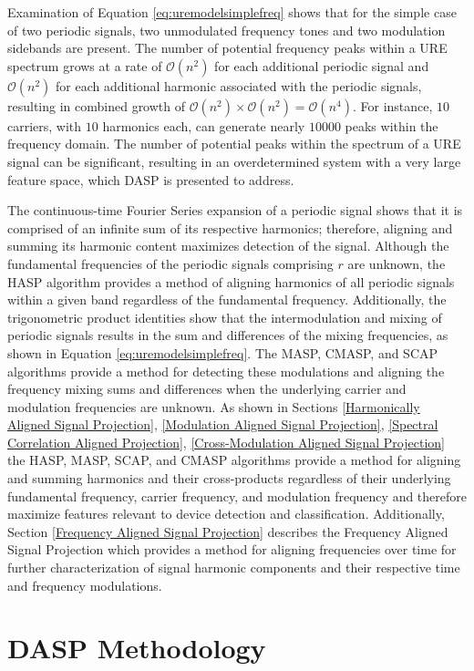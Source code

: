 Examination of Equation \ref{eq:uremodelsimplefreq} shows that for the simple case of two periodic signals, two unmodulated frequency tones and two modulation sidebands are present.  The number of potential frequency peaks within a URE spectrum grows at a rate of $\mathcal{O}(n^2)$ for each additional periodic signal and $\mathcal{O}(n^2)$ for each additional harmonic associated with the periodic signals, resulting in combined growth of $\mathcal{O}(n^2) \times \mathcal{O}(n^2) = \mathcal{O}(n^4)$.  For instance, $10$ carriers, with $10$ harmonics each, can generate nearly $10000$ peaks within the frequency domain. The number of potential peaks within the spectrum of a URE signal can be significant, resulting in an overdetermined system with a very large feature space, which DASP is presented to address.   

The continuous-time Fourier Series expansion of a periodic signal shows that it is comprised of an infinite sum of its respective harmonics; therefore, aligning and summing its harmonic content maximizes detection of the signal.  Although the fundamental frequencies of the periodic signals comprising $r$ are unknown, the HASP algorithm provides a method of aligning harmonics of all periodic signals within a given band regardless of the fundamental frequency.  Additionally, the trigonometric product identities show that the intermodulation and mixing of periodic signals results in the sum and differences of the mixing frequencies, as shown in Equation \ref{eq:uremodelsimplefreq}.  The MASP, CMASP, and SCAP algorithms provide a method for detecting these modulations and aligning the frequency mixing sums and differences when the underlying carrier and modulation frequencies are unknown.  As shown in Sections \ref{Harmonically Aligned Signal Projection}, \ref{Modulation Aligned Signal Projection}, \ref{Spectral Correlation Aligned Projection}, \ref{Cross-Modulation Aligned Signal Projection} the HASP, MASP, SCAP, and CMASP algorithms provide a method for aligning and summing harmonics and their cross-products regardless of their underlying fundamental frequency, carrier frequency, and modulation frequency and therefore maximize features relevant to device detection and classification.  Additionally, Section \ref{Frequency Aligned Signal Projection} describes the Frequency Aligned Signal Projection which provides a method for aligning frequencies over time for further characterization of signal harmonic components and their respective time and frequency modulations.

\section[DASP Methodology]{DASP Methodology}

